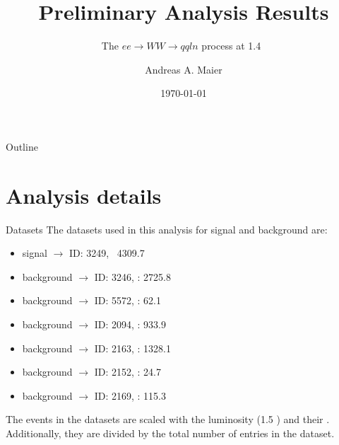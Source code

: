 \documentclass{beamer}
\title{Preliminary Analysis Results}
\subtitle{The $ee \rightarrow WW \rightarrow qqln$ process at 1.4~\TeV}
\author{Andreas A. Maier\inst{1}}
\institute[CERN] %
{
  \inst{1}%
  CERN
}
\date{\today}
\begin{document}
\begin{frame}
  \titlepage
\end{frame}






























\begin{frame}{Outline}
  \begin{multicols}{2}
    \tableofcontents
  \end{multicols}
\end{frame}









\section{Analysis details}

\begin{frame}{Datasets}
The datasets used in this analysis for signal and background are:
\begin{itemize}
\item signal \qqln $\rightarrow$ ID: 3249, \xsec\ 4309.7~\fb
\item background \qqll $\rightarrow$ ID: 3246, \xsec: 2725.8~\fb
\item background \qqqqll $\rightarrow$ ID: 5572, \xsec: 62.1~\fb
\item background \qqnn $\rightarrow$ ID: 2094, \xsec: 933.9~\fb
\item background \qqqq $\rightarrow$ ID: 2163, \xsec: 1328.1~\fb
\item background \qqqqnn $\rightarrow$ ID: 2152, \xsec: 24.7~\fb
\item background \qqqqln $\rightarrow$ ID: 2169, \xsec: 115.3~\fb
\end{itemize}
The events in the datasets are scaled with the luminosity (1.5 \invab) and their \xsec.
%
Additionally, they are divided by the total number of entries in the dataset.
\end{frame}
\end{document}
